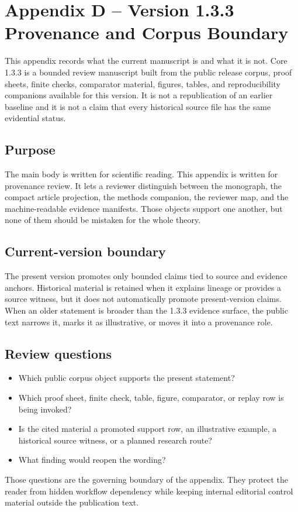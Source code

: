 \section{Appendix D -- Version 1.3.3 Provenance and Corpus Boundary}
\label{sec:oc133-provenance-corpus-boundary}

This appendix records what the current manuscript is and what it is not. Core
1.3.3 is a bounded review manuscript built from the public release corpus,
proof sheets, finite checks, comparator material, figures, tables, and
reproducibility companions available for this version. It is not a republication
of an earlier baseline and it is not a claim that every historical source file
has the same evidential status.

\subsection{Purpose}

The main body is written for scientific reading. This appendix is written for
provenance review. It lets a reviewer distinguish between the monograph, the
compact article projection, the methods companion, the reviewer map, and the
machine-readable evidence manifests. Those objects support one another, but
none of them should be mistaken for the whole theory.

\subsection{Current-version boundary}

The present version promotes only bounded claims tied to source and evidence
anchors. Historical material is retained when it explains lineage or provides a
source witness, but it does not automatically promote present-version claims.
When an older statement is broader than the 1.3.3 evidence surface, the public
text narrows it, marks it as illustrative, or moves it into a provenance role.

\subsection{Review questions}

\begin{itemize}
\item Which public corpus object supports the present statement?
\item Which proof sheet, finite check, table, figure, comparator, or replay row
      is being invoked?
\item Is the cited material a promoted support row, an illustrative example, a
      historical source witness, or a planned research route?
\item What finding would reopen the wording?
\end{itemize}

Those questions are the governing boundary of the appendix. They protect the
reader from hidden workflow dependency while keeping internal editorial control
material outside the publication text.
